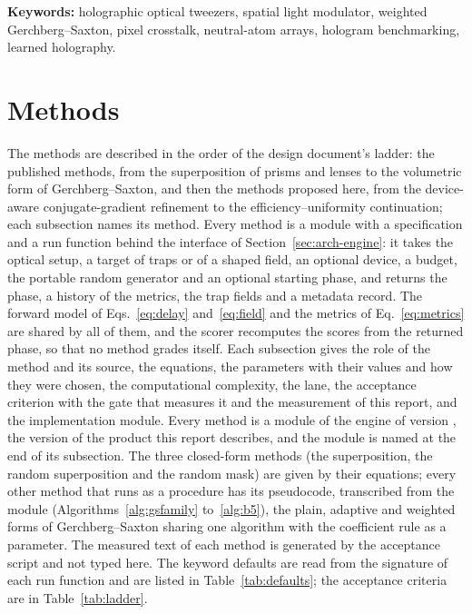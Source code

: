 \documentclass[10pt,a4paper]{article}
\begin{document}
\noindent\textbf{Keywords:} holographic optical tweezers, spatial light modulator, weighted Gerchberg--Saxton, pixel crosstalk, neutral-atom arrays, hologram benchmarking, learned holography.





\section{Methods}\label{sec:methods}

The methods are described in the order of the design document's ladder: the published methods, from the superposition of prisms and lenses to the volumetric form of Gerchberg--Saxton, and then the methods proposed here, from the device-aware conjugate-gradient refinement to the efficiency--uniformity continuation; each subsection names its method. Every method is a module with a specification and a run function behind the interface of Section~\ref{sec:arch-engine}: it takes the optical setup, a target of traps or of a shaped field, an optional device, a budget, the portable random generator and an optional starting phase, and returns the phase, a history of the metrics, the trap fields and a metadata record. The forward model of Eqs.~\eqref{eq:delay} and~\eqref{eq:field} and the metrics of Eq.~\eqref{eq:metrics} are shared by all of them, and the scorer recomputes the scores from the returned phase, so that no method grades itself. Each subsection gives the role of the method and its source, the equations, the parameters with their values and how they were chosen, the computational complexity, the lane, the acceptance criterion with the gate that measures it and the measurement of this report, and the implementation module. Every method is a module of the engine of version \productVersion{}, the version of the product this report describes, and the module is named at the end of its subsection. The three closed-form methods (the superposition, the random superposition and the random mask) are given by their equations; every other method that runs as a procedure has its pseudocode, transcribed from the module (Algorithms~\ref{alg:gsfamily} to~\ref{alg:b5}), the plain, adaptive and weighted forms of Gerchberg--Saxton sharing one algorithm with the coefficient rule as a parameter. The measured text of each method is generated by the acceptance script and not typed here. The keyword defaults are read from the signature of each run function and are listed in Table~\ref{tab:defaults}; the acceptance criteria are in Table~\ref{tab:ladder}.










\end{document}
